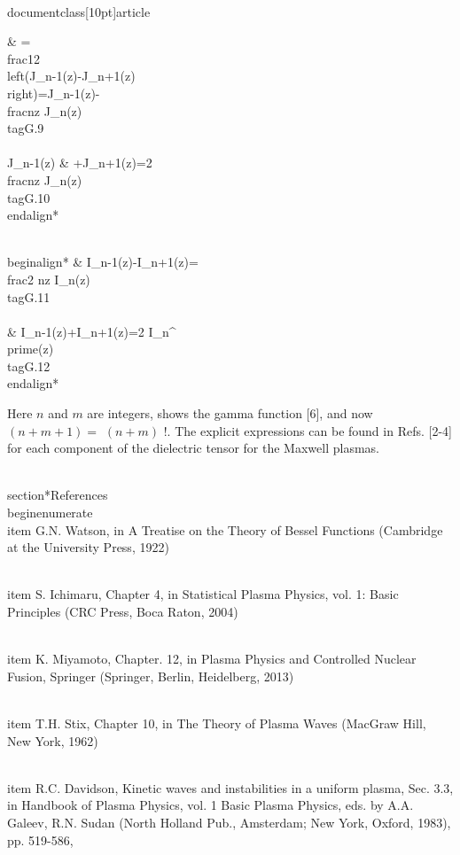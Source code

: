 \\documentclass[10pt]{article}
\begin{document}
{{{{{{& =\\frac{1}{2}\\left(J_{n-1}(z)-J_{n+1}(z)\\right)=J_{n-1}(z)-\\frac{n}{z} J_{n}(z)  \\tag{G.9}\\\\
J_{n-1}(z) & +J_{n+1}(z)=2 \\frac{n}{z} J_{n}(z) \\tag{G.10}
\\end{align*}



\\begin{align*}
& I_{n-1}(z)-I_{n+1}(z)=\\frac{2 n}{z} I_{n}(z)  \\tag{G.11}\\\\
& I_{n-1}(z)+I_{n+1}(z)=2 I_{n}^{\\prime}(z) \\tag{G.12}
\\end{align*}


Here $n$ and $m$ are integers, shows the gamma function [6], and now $(n+m+1)=$ $(n+m)$ !. The explicit expressions can be found in Refs. [2-4] for each component of the dielectric tensor for the Maxwell plasmas.

\\section*{References}
\\begin{enumerate}
  \\item G.N. Watson, in A Treatise on the Theory of Bessel Functions (Cambridge at the University Press, 1922)

  \\item S. Ichimaru, Chapter 4, in Statistical Plasma Physics, vol. 1: Basic Principles (CRC Press, Boca Raton, 2004)

  \\item K. Miyamoto, Chapter. 12, in Plasma Physics and Controlled Nuclear Fusion, Springer (Springer, Berlin, Heidelberg, 2013)

  \\item T.H. Stix, Chapter 10, in The Theory of Plasma Waves (MacGraw Hill, New York, 1962)

  \\item R.C. Davidson, Kinetic waves and instabilities in a uniform plasma, Sec. 3.3, in Handbook of Plasma Physics, vol. 1 Basic Plasma Physics, eds. by A.A. Galeev, R.N. Sudan (North Holland Pub., Amsterdam; New York, Oxford, 1983), pp. 519-586,

}}}}}}
\end{document}
